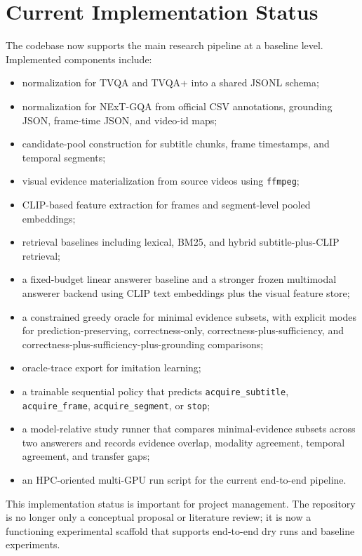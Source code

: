 \documentclass{article}
\begin{document}
\section{Current Implementation Status}
The codebase now supports the main research pipeline at a baseline level.
Implemented components include:
\begin{itemize}
  \item normalization for TVQA and TVQA+ into a shared JSONL schema;
  \item normalization for NExT-GQA from official CSV annotations, grounding JSON, frame-time JSON, and video-id maps;
  \item candidate-pool construction for subtitle chunks, frame timestamps, and temporal segments;
  \item visual evidence materialization from source videos using \texttt{ffmpeg};
  \item CLIP-based feature extraction for frames and segment-level pooled embeddings;
  \item retrieval baselines including lexical, BM25, and hybrid subtitle-plus-CLIP retrieval;
  \item a fixed-budget linear answerer baseline and a stronger frozen multimodal answerer backend using CLIP text embeddings plus the visual feature store;
  \item a constrained greedy oracle for minimal evidence subsets, with explicit modes for prediction-preserving, correctness-only, correctness-plus-sufficiency, and correctness-plus-sufficiency-plus-grounding comparisons;
  \item oracle-trace export for imitation learning;
  \item a trainable sequential policy that predicts \texttt{acquire\_subtitle}, \texttt{acquire\_frame}, \texttt{acquire\_segment}, or \texttt{stop};
  \item a model-relative study runner that compares minimal-evidence subsets across two answerers and records evidence overlap, modality agreement, temporal agreement, and transfer gaps;
  \item an HPC-oriented multi-GPU run script for the current end-to-end pipeline.
\end{itemize}

This implementation status is important for project management.
The repository is no longer only a conceptual proposal or literature review; it is now a functioning experimental scaffold that supports end-to-end dry runs and baseline experiments.
\end{document}

